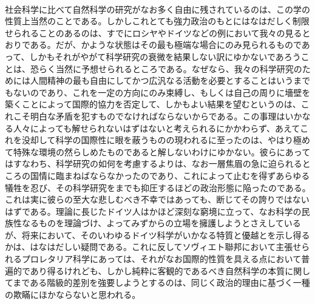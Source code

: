 \documentclass[8pt]{extreport}
\begin{document}
\begin{CJK}{UTF8}{min}
\\	社会科学に比べて自然科学の研究がなお多く自由に残されているのは、この学の性質上当然のことである。しかしこれとても強力政治のもとにはなはだしく制限せられることのあるのは、すでにロシヤやドイツなどの例において我々の見るとおりである。だが、かような状態はその最も極端な場合にのみ見られるものであって、しかもそれがやがて科学研究の衰微を結果しない訳にゆかないであろうことは、恐らく当然に予想せられるところである。なぜなら、我々の科学研究のためには人間精神の最も自由にしてかつ広汎なる活動を必要とすることはいうまでもないのであり、これを一定の方向にのみ束縛し、もしくは自己の周りに墻壁を築くことによって国際的協力を否定して、しかもよい結果を望むというのは、これこそ明白な矛盾を犯すものでなければならないからである。この事理はいかなる人々によっても解せられないはずはないと考えられるにかかわらず、あえてこれを没却して科学の国際性に眼を蔽うものの現われるに至ったのは、やはり極めて特殊な環境の然らしめたものであると解しないわけにゆかない。彼らにあってはすなわち、科学研究の如何を考慮するよりは、なお一層焦眉の急に迫られるところの国情に臨まねばならなかったのであり、これによって止むを得ずあらゆる犠牲を忍び、その科学研究をまでも抑圧するほどの政治形態に陥ったのである。これは実に彼らの至大な悲しむべき不幸ではあっても、断じてその誇りではないはずである。理論に長じたドイツ人はかほど深刻な窮境に立って、なお科学の民族性なるものを理論づけ、よってみずからの立場を擁護しようとさえしているが、将来において、そのいわゆるドイツ科学がいかなる特質と優越とを示し得るかは、はなはだしい疑問である。これに反してソヴィエト聯邦において主張せられるプロレタリア科学にあっては、それがなお国際的性質を具える点において普遍的であり得るけれども、しかし純粋に客観的であるべき自然科学の本質に関してまである階級的差別を強要しようとするのは、同じく政治的理由に基づく一種の欺瞞にほかならないと思われる。

\end{CJK}
\end{document}
